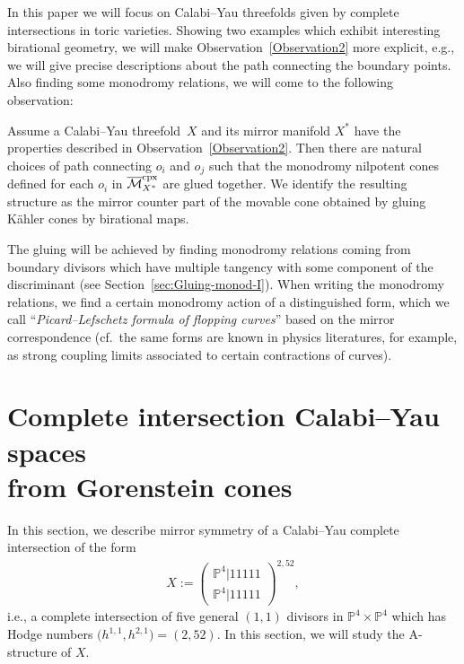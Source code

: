 \documentclass[pdftex]{sigma}
\numberwithin{equation}{section}
\begin{document}
In this paper we will focus on Calabi--Yau threefolds given by complete intersections in toric varieties. Showing two examples which exhibit interesting birational geometry, we will make Observation~\ref{Observation2} more explicit, e.g., we will give precise descriptions about the path connecting the boundary points. Also finding some monodromy relations, we will come to the following observation:

\begin{Main} Assume a Calabi--Yau threefold~$X$ and its mirror manifold $X^{*}$ have the properties described in Observation~\ref{Observation2}. Then there are natural choices of path connecting $o_{i}$ and $o_{j}$ such that the monodromy nilpotent cones defined for each $o_{i}$ in $\overline{\mathcal{M}}_{X^{*}}^{\rm cpx}$ are glued together. We identify the resulting structure as the mirror counter part of the movable cone obtained by gluing K\"ahler cones by birational maps.
\end{Main}

The gluing will be achieved by finding monodromy relations coming from boundary divisors which have multiple tangency with some component of the discriminant (see Section~\ref{sec:Gluing-monod-I}). When writing the monodromy relations, we find a certain monodromy action of a distinguished form, which we call ``\textit{Picard--Lefschetz formula of flopping curves}'' based on the mirror correspondence (cf.\ the same forms are known in physics literatures, \cite{A-Scheideg, CandelasTwoI} for example, as strong coupling limits associated to certain contractions of curves).

\section[Complete intersection Calabi--Yau spaces from Gorenstein cones]{Complete intersection Calabi--Yau spaces\\ from Gorenstein cones}\label{sec: CICY-I}

In this section, we describe mirror symmetry of a Calabi--Yau complete intersection of the form
\begin{gather}
 X:=\left(\begin{matrix}\mathbb{P}^{4}|11111\\
\mathbb{P}^{4}|11111
\end{matrix}\right)^{2,52},\label{eq:XP4P4}
\end{gather}
i.e., a complete intersection of five general $(1,1)$ divisors in $\mathbb{P}^{4}\times\mathbb{P}^{4}$ which has Hodge numbers $\big(h^{1,1},h^{2,1}\big)=(2,52)$. In this section, we will study the A-structure of $X$.
\end{document}
